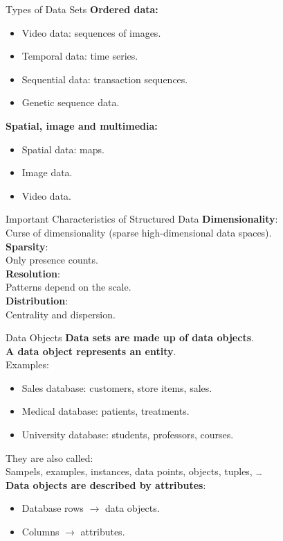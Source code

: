 \begin{frame}{Types of Data Sets}
	\textbf{Ordered data:}
	\begin{itemize}[noitemsep]
		\item Video data: sequences of images.
		\item Temporal data: time series.
		\item Sequential data: transaction sequences.
		\item Genetic sequence data.
	\end{itemize}
	\textbf{Spatial, image and multimedia:}
	\begin{itemize}[noitemsep]
		\item Spatial data: maps.
		\item Image data.
		\item Video data.
	\end{itemize}
\end{frame}

\begin{frame}{Important Characteristics of Structured Data}
	\textbf{Dimensionality}:\\
	Curse of dimensionality (sparse high-dimensional data spaces).\\[0.2cm]

	\textbf{Sparsity}:\\
	Only presence counts.\\[0.2cm]

	\textbf{Resolution}:\\
	Patterns depend on the scale.\\[0.2cm]

	\textbf{Distribution}:\\
	Centrality and dispersion.
\end{frame}

\begin{frame}{Data Objects}
	\textbf{Data sets are made up of data objects}.\\
	\textbf{A data object represents an entity}.\\[0.2cm]

	Examples:
	\begin{itemize}
		\item Sales database: customers, store items, sales.
		\item Medical database: patients, treatments.
		\item University database: students, professors, courses.
	\end{itemize}

	They are also called:\\
	Sampels, examples, instances, data points, objects, tuples, \ldots\\[0.2cm]

	\textbf{Data objects are described by attributes}:
	\begin{itemize}
		\item Database rows $\rightarrow$ data objects.
		\item Columns $\rightarrow$ attributes.
	\end{itemize}
\end{frame}

